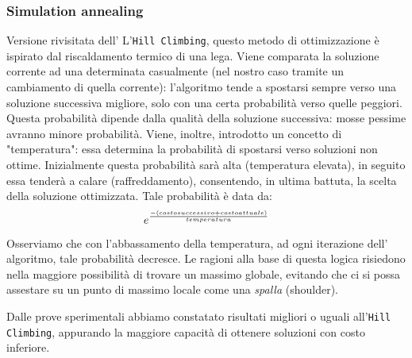 			\subsubsection{Simulation annealing}
				Versione rivisitata dell' L'\texttt{Hill Climbing}, questo metodo di ottimizzazione è ispirato dal riscaldamento termico di una lega. Viene comparata la soluzione corrente ad una determinata casualmente (nel nostro caso tramite un cambiamento di quella corrente): l'algoritmo tende a spostarsi sempre verso una soluzione successiva migliore, solo con una certa probabilità verso quelle peggiori. Questa probabilità dipende dalla qualità della soluzione successiva: mosse pessime avranno minore probabilità. Viene, inoltre, introdotto un concetto di "temperatura": essa determina la probabilità di spostarsi verso soluzioni non ottime. Inizialmente questa probabilità sarà alta (temperatura elevata), in seguito essa tenderà a calare (raffreddamento), consentendo, in ultima battuta, la scelta della soluzione ottimizzata. Tale probabilità è data da:
				\begin{equation*}
				{\LARGE e^{\frac{-(costosuccessivo+costoattuale)}{temperatura}}}
				\end{equation*}
				Osserviamo che con l'abbassamento della temperatura, ad ogni iterazione dell' algoritmo, tale probabilità decresce.
				Le ragioni alla base di questa logica risiedono nella maggiore possibilità di trovare un massimo globale, evitando che ci si possa assestare su un punto di massimo locale come una \emph{spalla} (shoulder).\par
				Dalle prove sperimentali abbiamo constatato risultati migliori o uguali all'\texttt{Hill Climbing}, appurando la maggiore capacità di ottenere soluzioni con costo inferiore.
				

